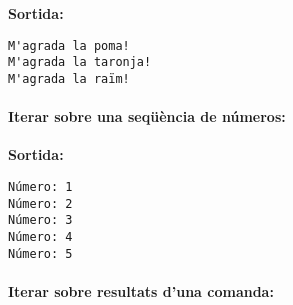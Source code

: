 \documentclass[
  12 pt,
  a4paper,
]{article}
\newenvironment{Shaded}{\begin{snugshade}}{\end{snugshade}}
\newcommand{\BuiltInTok}[1]{#1}
\newcommand{\CommentTok}[1]{\textcolor[rgb]{0.56,0.35,0.01}{\textit{#1}}}
\newcommand{\ControlFlowTok}[1]{\textcolor[rgb]{0.13,0.29,0.53}{\textbf{#1}}}
\newcommand{\DataTypeTok}[1]{\textcolor[rgb]{0.13,0.29,0.53}{#1}}
\newcommand{\DecValTok}[1]{\textcolor[rgb]{0.00,0.00,0.81}{#1}}
\newcommand{\FunctionTok}[1]{\textcolor[rgb]{0.13,0.29,0.53}{\textbf{#1}}}
\newcommand{\KeywordTok}[1]{\textcolor[rgb]{0.13,0.29,0.53}{\textbf{#1}}}
\newcommand{\NormalTok}[1]{#1}
\newcommand{\PreprocessorTok}[1]{\textcolor[rgb]{0.56,0.35,0.01}{\textit{#1}}}
\newcommand{\StringTok}[1]{\textcolor[rgb]{0.31,0.60,0.02}{#1}}
\newcommand{\VariableTok}[1]{\textcolor[rgb]{0.00,0.00,0.00}{#1}}
\begin{document}
\begin{Shaded}
\end{Shaded}

\textbf{Sortida:}

\begin{verbatim}
M'agrada la poma!
M'agrada la taronja!
M'agrada la raïm!
\end{verbatim}

\paragraph{Iterar sobre una seqüència de
números:}\label{iterar-sobre-una-sequxfcuxe8ncia-de-nuxfameros}

\begin{Shaded}
\end{Shaded}

\textbf{Sortida:}

\begin{verbatim}
Número: 1
Número: 2
Número: 3
Número: 4
Número: 5
\end{verbatim}

\paragraph{Iterar sobre resultats d'una
comanda:}\label{iterar-sobre-resultats-duna-comanda}

\begin{Shaded}
\end{Shaded}
\end{document}
